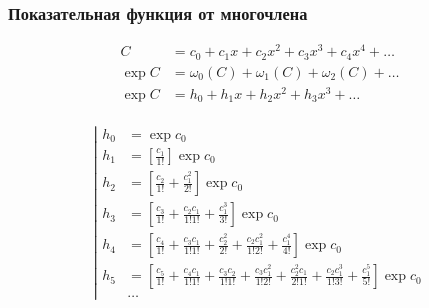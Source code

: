 \subsubsection{Показательная функция от многочлена}

\begin{equation*}
\begin{aligned}
C &= c_0 + c_1 x + c_2 x^2 + c_3 x^3 + c_4 x^4 + \ldots \\
\exp{C} &= \omega_{0}(C) + \omega_{1}(C) + \omega_{2}(C) + \ldots \\
\exp{C} &= h_0 + h_1 x + h_2 x^2 + h_3 x^3 + \ldots \\
\end{aligned}
\end{equation*}

\begin{equation*}
\left|
\begin{aligned}
h_0 &= \exp{c_0}
\\
h_1 
&= \left[\frac{c_1}{1!} \right] \exp{c_0}
\\ 
h_2 
&= \left[\frac{c_2}{1!} 
+ \frac{c_1^2}{2!} \right] \exp{c_0}
\\
h_3 
&= \left[\frac{c_3}{1!} 
+ \frac{c_2 c_1}{1!1!} 
+ \frac{c_1^3}{3!} \right] \exp{c_0}
\\
h_4 
&= \left[\frac{c_4}{1!} 
+ \frac{c_3 c_1}{1!1!} 
+ \frac{c_2^2}{2!} 
+ \frac{c_2 c_1^2}{1!2!} 
+ \frac{c_1^4}{4!} \right] \exp{c_0}
\\
h_5
&= \left[\frac{c_5}{1!}
+ \frac{c_4 c_1}{1!1!}
+ \frac{c_3 c_2}{1!1!}
+ \frac{c_3 c_1^2}{1!2!}
+ \frac{c_2^2 c_1}{2!1!}
+ \frac{c_2 c_1^3}{1!3!}
+ \frac{c_1^5}{5!} \right] \exp{c_0}
\\
&\ldots
\end{aligned}
\right.
\end{equation*}
